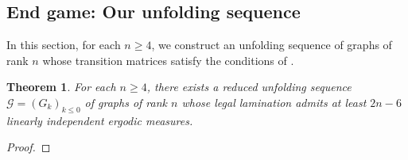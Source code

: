 \documentclass[11pt, letterpaper]{amsart}
\theoremstyle{plain}
\newtheorem{theorem}{Theorem}[section]
\theoremstyle{definition}
\newcommand{\calG}{\mathcal{G}}
\begin{document}
\subsection{End game: Our unfolding sequence}
\label{ssec:lowerboundFinale}
In this section, for each $n\geq 4$, we construct an unfolding sequence of graphs of rank $n$ whose transition matrices satisfy the conditions of .

\begin{theorem} \label{thm:lowerboundFinale_unfolding} 
For each $n \ge 4$, there exists a reduced unfolding sequence
$\calG=(G_k)_{k \le 0}$ of graphs
of rank $n$ whose legal lamination admits at least $2n-6$ linearly independent ergodic measures.
\end{theorem}

\begin{proof}


\end{proof}
\end{document}
